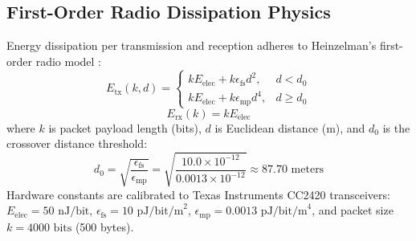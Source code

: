 \documentclass[journal]{IEEEtran}
\begin{document}
\subsection{First-Order Radio Dissipation Physics}
Energy dissipation per transmission and reception adheres to Heinzelman's first-order radio model \cite{heinzelman2002application}:
\begin{equation}
E_{\text{tx}}(k, d) = 
\begin{cases}
k E_{\text{elec}} + k \epsilon_{\text{fs}} d^2, & d < d_0 \\
k E_{\text{elec}} + k \epsilon_{\text{mp}} d^4, & d \ge d_0
\end{cases}
\end{equation}
\begin{equation}
E_{\text{rx}}(k) = k E_{\text{elec}}
\end{equation}
where $k$ is packet payload length (bits), $d$ is Euclidean distance (m), and $d_0$ is the crossover distance threshold:
\begin{equation}
d_0 = \sqrt{\frac{\epsilon_{\text{fs}}}{\epsilon_{\text{mp}}}} = \sqrt{\frac{10.0 \times 10^{-12}}{0.0013 \times 10^{-12}}} \approx 87.70\text{ meters}
\end{equation}
Hardware constants are calibrated to Texas Instruments CC2420 transceivers: $E_{\text{elec}} = 50\text{ nJ/bit}$, $\epsilon_{\text{fs}} = 10\text{ pJ/bit/m}^2$, $\epsilon_{\text{mp}} = 0.0013\text{ pJ/bit/m}^4$, and packet size $k = 4000\text{ bits}$ (500 bytes).
\end{document}
